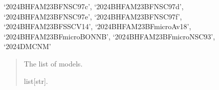 \documentclass[letterpaper,10pt,english]{sphinxmanual}
\begin{document}
\begin{fulllineitems}
‘2024\sphinxhyphen{}BHF\sphinxhyphen{}AM\sphinxhyphen{}23BF\sphinxhyphen{}NSC97c’, ‘2024\sphinxhyphen{}BHF\sphinxhyphen{}AM\sphinxhyphen{}23BF\sphinxhyphen{}NSC97d’,     ‘2024\sphinxhyphen{}BHF\sphinxhyphen{}AM\sphinxhyphen{}23BF\sphinxhyphen{}NSC97e’, ‘2024\sphinxhyphen{}BHF\sphinxhyphen{}AM\sphinxhyphen{}23BF\sphinxhyphen{}NSC97f’, ‘2024\sphinxhyphen{}BHF\sphinxhyphen{}AM\sphinxhyphen{}23BF\sphinxhyphen{}SSCV14’,    ‘2024\sphinxhyphen{}BHF\sphinxhyphen{}AM\sphinxhyphen{}23BFmicro\sphinxhyphen{}Av18’, ‘2024\sphinxhyphen{}BHF\sphinxhyphen{}AM\sphinxhyphen{}23BFmicro\sphinxhyphen{}BONNB’, ‘2024\sphinxhyphen{}BHF\sphinxhyphen{}AM\sphinxhyphen{}23BFmicro\sphinxhyphen{}NSC93’,    ‘2024\sphinxhyphen{}DMC\sphinxhyphen{}NM’
\begin{quote}\begin{description}
\sphinxAtStartPar
The list of models.

\sphinxAtStartPar
list{[}str{]}.

\end{description}\end{quote}

\end{fulllineitems}


\begin{fulllineitems}
\label{\detokenize{source/api/setup_eos_micro:nucleardatapy.eos.setup_micro.micro_models_group_NM}}
\pysigstartsignatures
{}
\pysigstopsignatures
\end{fulllineitems}


\begin{fulllineitems}
\label{\detokenize{source/api/setup_eos_micro:nucleardatapy.eos.setup_micro.micro_models_group_SM}}
\pysigstartsignatures
{}
\pysigstopsignatures
\end{fulllineitems}
\end{document}
